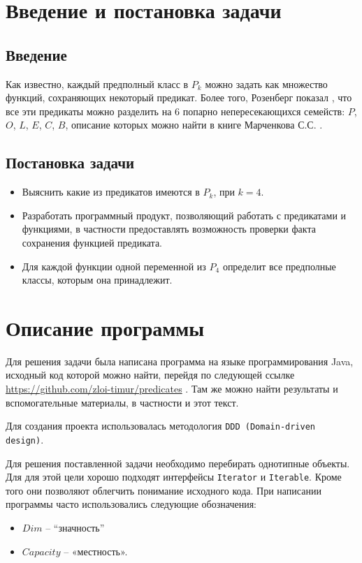 \documentclass[a4paper,14pt]{extreport}
\begin{document}
\newpage
\tableofcontents
\newpage
\chapter{ Введение и постановка задачи }

\section{Введение}
Как известно, каждый предполный класс в $P_k$ можно задать как множество функций, сохраняющих некоторый предикат. Более того, Розенберг показал \cite{roz1, roz2}, что все эти предикаты можно разделить на 6 попарно непересекающихся семейств: $P$, $O$, $L$, $E$, $C$, $B$, описание которых можно найти в книге Марченкова С.С. \cite{march}. 

\section{Постановка задачи}
\begin{itemize}
\item Выяснить какие из предикатов имеются в $P_k$, при $k=4$.
\item Разработать программный продукт, позволяющий работать с предикатами и функциями, в частности предоставлять возможность проверки факта сохранения функцией предиката.
\item Для каждой функции одной переменной из $P_4$ определит все предполные классы, которым она принадлежит.
\end{itemize}
 
\newpage
\chapter{Описание программы}
Для решения задачи была написана программа на языке программирования Java, исходный код которой можно найти, перейдя по следующей ссылке \url{https://github.com/zloi-timur/predicates} \cite{git}. Там же можно найти результаты и вспомогательные материалы, в частности и этот текст.

Для создания проекта использовалась методология {\tt DDD (Domain-driven design)}. 

Для решения поставленной задачи необходимо перебирать однотипные объекты. Для для этой цели хорошо подходят интерфейсы {\tt Iterator} и {\tt Iterable}. Кроме того они позволяют облегчить понимание исходного кода.
При написании программы часто использовались следующие обозначения:
\begin{itemize}
\item$Dim$ – “значность”
\item$Capacity$ – «местность».  
\end{itemize} 
\end{document}
